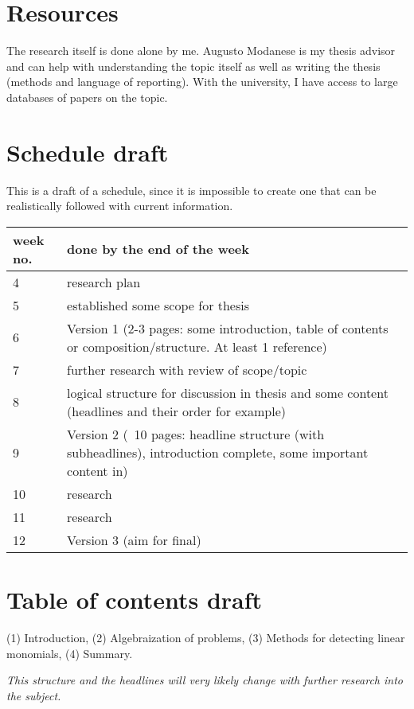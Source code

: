 \documentclass[12pt,a4paper,english,oneside]{article}
\begin{document}
\section{Resources}

The research itself is done alone by me. Augusto Modanese is my thesis advisor and can help with understanding the topic itself as well
as writing the thesis (methods and language of reporting). With the university, I have access to large databases of papers on the topic.

\section{Schedule draft}

This is a draft of a schedule, since it is impossible to create one that can be realistically followed with current information.

\begin{tabular}{|p{30mm}|p{120mm}|}
\hline
week no.   & done by the end of the week \\ \hline
4   & research plan \\ \hline
5   & established some scope for thesis \\ \hline
6   & Version 1 (2-3 pages: some introduction, table of contents or composition/structure. At least 1 reference) \\ \hline
7   & further research with review of scope/topic \\ \hline
8   & logical structure for discussion in thesis and some content (headlines and their order for example) \\ \hline
9   & Version 2 (~10 pages: headline structure (with subheadlines), introduction complete, some important content in) \\ \hline
10   & research \\ \hline
11   & research \\ \hline
12   & Version 3 (aim for final) \\ \hline
\end{tabular}


\section{Table of contents draft}

(1) Introduction,
(2) Algebraization of problems,
(3) Methods for detecting linear monomials,
(4) Summary.
%

\emph{This structure and the headlines will very likely change with further research into the subject.}
\end{document}
